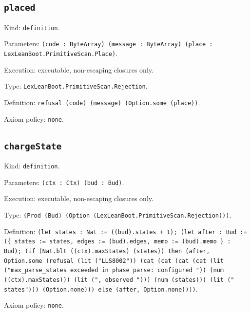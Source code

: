 \documentclass[11pt]{article}
\begin{document}
\subsection*{\texttt{placed}}
\noindent Kind: \texttt{definition}.\par
\noindent Parameters: \texttt{(code : ByteArray) (message : ByteArray) (place : LexLeanBoot.PrimitiveScan.Place)}.\par
\noindent Execution: executable, non-escaping closures only.\par
\noindent Type: \texttt{LexLeanBoot.PrimitiveScan.Rejection}.\par
\noindent Definition: \texttt{refusal (code) (message) (Option.some (place))}.\par
\noindent Axiom policy: \texttt{none}.\par
\subsection*{\texttt{chargeState}}
\noindent Kind: \texttt{definition}.\par
\noindent Parameters: \texttt{(ctx : Ctx) (bud : Bud)}.\par
\noindent Execution: executable, non-escaping closures only.\par
\noindent Type: \texttt{(Prod (Bud) (Option (LexLeanBoot.PrimitiveScan.Rejection)))}.\par
\noindent Definition: \texttt{(let states : Nat := ((bud).states + 1); (let after : Bud := (\{ states := states, edges := (bud).edges, memo := (bud).memo \} : Bud); (if (Nat.blt ((ctx).maxStates) (states)) then (after, Option.some (refusal (lit ("LLS8002")) (cat (cat (cat (cat (lit ("max\_parse\_states exceeded in phase parse: configured ")) (num ((ctx).maxStates))) (lit (", observed "))) (num (states))) (lit (" states"))) (Option.none))) else (after, Option.none))))}.\par
\noindent Axiom policy: \texttt{none}.\par
\end{document}
